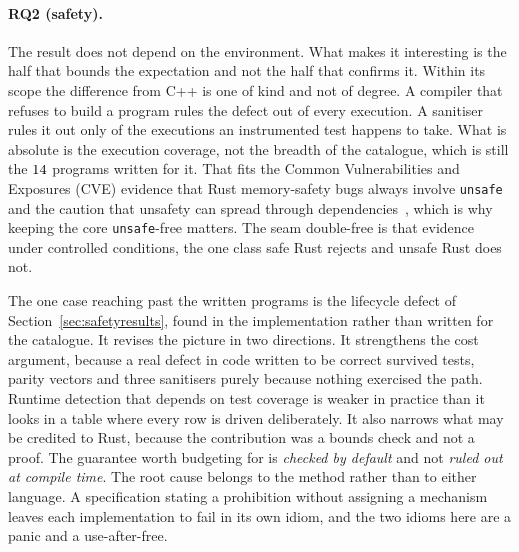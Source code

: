 \documentclass[english,oneside,a4paper,censored,csm,software-track-2020]{HYthesisML}
\begin{document}
\paragraph{RQ2 (safety).} The result does not depend on the environment. What makes it interesting
is the half that bounds the expectation and not the half that confirms it. Within its scope the
difference from C++ is one of kind and not of degree. A compiler that refuses to build a program
rules the defect out of every execution. A sanitiser rules it out only of the executions an
instrumented test happens to take. What is absolute is the execution coverage, not the breadth of
the catalogue, which is still the $14$ programs written for it. That fits the Common
Vulnerabilities and Exposures (CVE) evidence that Rust memory-safety bugs always involve
\texttt{unsafe}~\cite{xu2021rustcve} and the caution that unsafety can spread through
dependencies~\cite{evans2020rust}, which is why keeping the core \texttt{unsafe}-free matters. The
seam double-free is that evidence under controlled conditions, the one class safe Rust rejects
and unsafe Rust does not.

The one case reaching past the written programs is the lifecycle defect of
Section~\ref{sec:safetyresults}, found in the implementation rather than written for the
catalogue. It revises the picture in two directions. It strengthens the cost argument, because a
real defect in code written to be correct survived tests, parity vectors and three sanitisers
purely because nothing exercised the path. Runtime detection that depends on test coverage is
weaker in practice than it looks in a table where every row is driven deliberately. It also
narrows what may be credited to Rust, because the contribution was a bounds check and not a
proof. The guarantee worth budgeting for is \emph{checked by default} and not \emph{ruled out
at compile time}. The root cause belongs to the method rather than to either language. A
specification stating a prohibition without assigning a mechanism leaves each implementation to
fail in its own idiom, and the two idioms here are a panic and a use-after-free.
\end{document}

